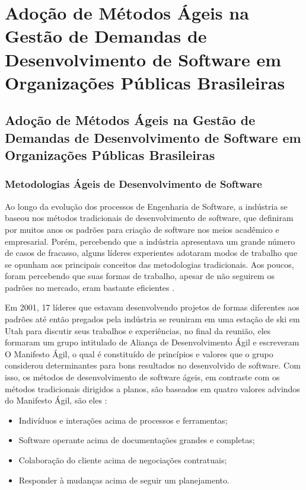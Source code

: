 \part{Adoção de Métodos Ágeis na Gestão de Demandas de Desenvolvimento de Software em Organizações Públicas Brasileiras}

\chapter[Adoção de Métodos Ágeis na Gestão de Demandas de Desenvolvimento de Software em Organizações Públicas Brasileiras]{Adoção de Métodos Ágeis na Gestão de Demandas de Desenvolvimento de Software em Organizações Públicas Brasileiras}

\section[Metodologias Ágeis de Desenvolvimento de Software]{Metodologias Ágeis de Desenvolvimento de Software}

Ao longo da evolução dos processos de Engenharia de Software, a indústria se baseou nos métodos tradicionais de desenvolvimento de software, que definiram por muitos anos os padrões para criação de software nos meios acadêmico e empresarial. Porém, percebendo que a indústria apresentava um grande número de casos de fracasso, alguns líderes experientes adotaram modos de trabalho que se opunham aos principais conceitos das metodologias tradicionais. Aos poucos, foram percebendo que suas formas de trabalho, apesar de não seguirem os padrões no mercado, eram bastante eficientes   \cite{filho}. 

Em 2001, 17 líderes que estavam desenvolvendo projetos de formas diferentes aos padrões até então pregados pela indústria se reuniram em uma estação de ski em Utah para discutir seus trabalhos e experiências, no final da reunião, eles formaram um grupo intitulado de Aliança de Desenvolvimento Ágil e escreveram O Manifesto Ágil, o qual é constituído de princípios e valores que o grupo considerou determinantes para bons resultados no desenvolvido de software. Com isso, os métodos de desenvolvimento de software ágeis, em contraste com os métodos tradicionais dirigidos a planos, são baseados em quatro valores advindos do Manifesto Ágil, são eles \cite{manifesto}:
\begin{itemize}
\item Indivíduos e interações acima de processos e ferramentas;
\item Software operante acima de documentações grandes e completas;
\item Colaboração do cliente acima de negociações contratuais;
\item Responder à mudanças acima de seguir um planejamento.
\end{itemize}


